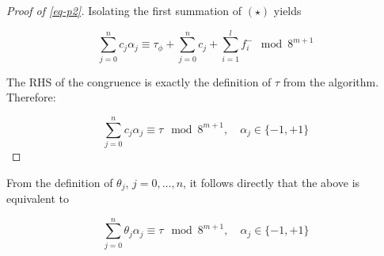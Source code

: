 \documentclass{amsart}
\theoremstyle{plain}
\begin{document}
\begin{proof}[Proof of \autoref{eq-p2}]
Isolating the first summation of $(\star)$ yields

\begin{equation*}
  \sum_{j=0}^n c_j\alpha_j\equiv\tau_\phi+\sum_{j=0}^n c_j+\sum_{i=1}^l f_i^-\mod 8^{m+1}
\end{equation*}

The RHS of the congruence is exactly the definition of $\tau$ from the algorithm. Therefore:

\begin{equation*}
  \sum_{j=0}^n c_j\alpha_j\equiv\tau\mod 8^{m+1}, \quad\alpha_j\in\{-1,+1\}
\end{equation*}

\end{proof}

From the definition of $\theta_j$, $j=0,\ldots,n$, it follows directly that the above is equivalent
to

\begin{equation*}
  \sum_{j=0}^n\theta_j\alpha_j\equiv\tau\mod 8^{m+1}, \quad\alpha_j\in\{-1,+1\}
\end{equation*}
\end{document}
